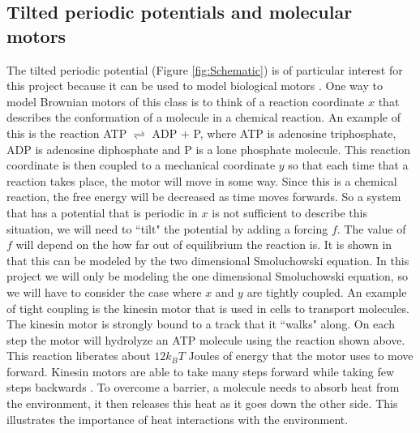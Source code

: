 \subsection{Tilted periodic potentials and molecular motors}
The tilted periodic potential (Figure \ref{fig:Schematic}) is of particular interest for this project because it can be used to model biological motors \cite{Leibler1993,Magnasco1994}. One way to model Brownian motors of this class is to think of a reaction coordinate $x$ that describes the conformation of a molecule in a chemical reaction. An example of this is the reaction ATP $\rightleftharpoons$ ADP + P, where ATP is adenosine triphosphate, ADP is adenosine diphosphate and P is a lone phosphate molecule. This reaction coordinate is then coupled to a mechanical coordinate $y$ so that each time that a reaction takes place, the motor will move in some way. Since this is a chemical reaction, the free energy will be decreased as time moves forwards. So a system that has a potential that is periodic in $x$ is not sufficient to describe this situation, we will need to ``tilt" the potential by adding a forcing $f$. The value of $f$ will depend on the how far out of equilibrium the reaction is. It is shown in \cite{Magnasco1994} that this can be modeled by the two dimensional Smoluchowski equation. In this project we will only be modeling the one dimensional Smoluchowski equation, so we will have to consider the case where $x$ and $y$ are tightly coupled. An example of tight coupling is the kinesin motor \cite{Leibler1993} that is used in cells to transport molecules. The kinesin motor is strongly bound to a track that it ``walks" along. On each step the motor will hydrolyze an ATP molecule using the reaction shown above. This reaction liberates about $12 k_B T$ Joules of energy that the motor uses to move forward. Kinesin motors are able to take many steps forward while taking few steps backwards \cite{BlockSM1990}. To overcome a barrier, a molecule needs to absorb heat from the environment, it then releases this heat as it goes down the other side. This illustrates the importance of heat interactions with the environment.
